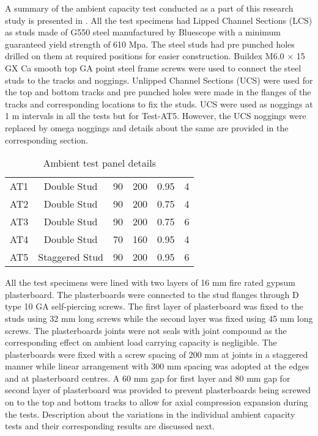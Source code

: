 A summary of the ambient capacity test conducted as a part of this research study is presented in . All the test specimens had Lipped Channel Sections (LCS) as studs made of G550 steel manufactured by Bluescope with a minimum guaranteed yield strength of 610 Mpa. The steel studs had pre punched holes drilled on them at required positions for easier construction. Buildex M6.0 \(\times\) 15 GX Ca smooth top GA point steel frame screws were used to connect the steel studs to the tracks and noggings. Unlipped Channel Sections (UCS) were used for the top and bottom tracks and pre punched holes were made in the flanges of the tracks and corresponding locations to fix the studs. UCS were used as noggings at 1 m intervals in all the tests but for Test-AT5. However, the UCS noggings were replaced by omega noggings and details about the same are provided in the corresponding section.
\begin{table}[!htbp]
	\centering
	\caption{Ambient test panel details}
	\begin{tabular}{cccccc}
		\toprule
		\multicolumn{1}{m{2.4em}}{\centering{Test Name}} & 
		\multicolumn{1}{m{5.6em}}{\centering{Description}} & 
		\multicolumn{1}{m{2.85em}}{\centering{Stud Depth (mm)}} & 
		\multicolumn{1}{m{2.85em}}{\centering{Cavity Depth (mm)}} & 
		\multicolumn{1}{m{5em}}{\centering{Stud Thickness (mm)}} & 
		\multicolumn{1}{m{3em}}{\centering{No of Studs}} \\
		\midrule
		AT1  & Double Stud & 90 & 200 & 0.95 & 4 \\
		AT2  & Double Stud & 90 & 200 & 0.75 & 4 \\
		AT3  & Double Stud & 90 & 200 & 0.75 & 6 \\
		AT4  & Double Stud & 70 & 160 & 0.95 & 4 \\
		AT5  & Staggered Stud & 90 & 200 & 0.95 & 6 \\
		\bottomrule
	\end{tabular}%
	\label{tab:ambient-test-specimens}%
\end{table}%

All the test specimens were lined with two layers of 16 mm fire rated gypsum plasterboard. The plasterboards were connected to the stud flanges through D type 10 GA self-piercing screws. The first layer of plasterboard was fixed to the studs using 32 mm long screws while the second layer was fixed using 45 mm long screws. The plasterboards joints were not seals with joint compound as the corresponding effect on ambient load carrying capacity is negligible. The plasterboards were fixed with a screw spacing of 200 mm at joints in a staggered manner while linear arrangement with 300 mm spacing was adopted at the edges and at plasterboard centres. A 60 mm gap for first layer and 80 mm gap for second layer of plasterboard was provided to prevent plasterboards being screwed on to the top and bottom tracks to allow for axial compression expansion during the tests. Description about the variations in the individual ambient capacity tests and their corresponding results are discussed next.

